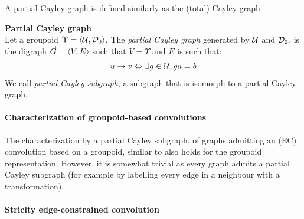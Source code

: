 A partial Cayley graph is defined similarly as the (total) Cayley graph.

\begin{definition}\textbf{Partial Cayley graph}\\
Let a groupoid $\Upsilon = \langle \mathcal{U}, \mathcal{D}_0 \rangle$. The \emph{partial Cayley graph} generated by $\mathcal{U}$ and $\mathcal{D}_0$, is the digraph $\vec{G} = \langle V, E \rangle$ such that $V = \Upsilon$ and $E$ is such that:
\begin{gather*}
u \rightarrow v \Leftrightarrow \exists g \in \mathcal{U}, ga = b
\end{gather*}
We call \emph{partial Cayley subgraph}, a subgraph that is isomorph to a partial Cayley graph.
\end{definition}

\paragraph{Characterization of groupoid-based convolutions}

The characterization by a partial Cayley subgraph, of graphs admitting an (EC) convolution based on a groupoid, similar to  also holds for the groupoid representation. However, it is somewhat trivial as every graph admits a partial Cayley subgraph (for example by labelling every edge in a neighbour with a transformation).

\paragraph{Striclty edge-constrained convolution}

\todo{}
